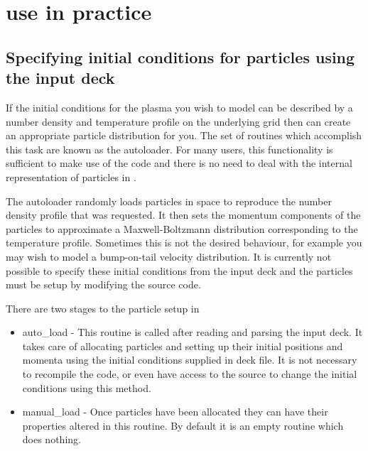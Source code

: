\section{\texorpdfstring
  {{\EPOCH} use in practice}
  {{EPOCH} use in practice}}
\label{sec:usage}

\subsection{Specifying initial conditions for particles using the input deck}

If the initial conditions for the plasma you wish to model can be described
by a number density and temperature profile on the underlying grid then
{\EPOCH} can create an appropriate particle distribution for you. The
set of routines which accomplish this task are known as the autoloader.
For many users, this functionality is sufficient to make use of the
code and there is no need to deal with the internal representation of
particles in {\EPOCH}.

The autoloader randomly loads particles in space to reproduce the number
density profile that was requested. It then sets the momentum components
of the particles to approximate a Maxwell-Boltzmann distribution
corresponding to the temperature profile. Sometimes this is not the
desired behaviour, for example you may wish to model a bump-on-tail
velocity distribution. It is currently not possible to specify these
initial conditions from the input deck and the particles must be setup
by modifying the source code.

There are two stages to the particle setup in {\EPOCH}

\begin{itemize}
\item auto\_load - This routine is called after reading and parsing the
  input deck. It takes care of allocating particles and setting up their
  initial positions and momenta using the initial conditions supplied in
  deck file.
  It is not necessary to recompile the code, or even have
  access to the source to change the initial conditions using this method.
\item manual\_load - Once particles have been allocated they can have their
  properties altered in this routine. By default it is an empty routine
  which does nothing.
\end{itemize}


